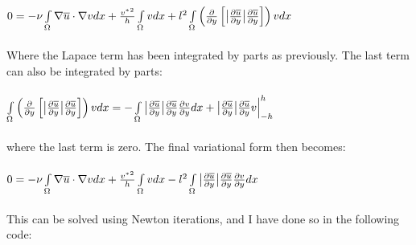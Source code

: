 \documentclass[a4paper,english,11pt,twoside]{article}
\begin{document}
\\
$0 = -\nu\int\limits_{\Omega}\nabla\overline{u}\cdot\nabla v dx + \frac{{v^*}^2}{h}\int\limits_{\Omega}v dx + l^2 \int\limits_{\Omega}\left(\frac{\partial}{\partial y}\left[\big|\frac{\partial\overline{u}}{\partial y}\big|\frac{\partial\overline{u}}{\partial y} \right]\right)v dx$\\
\\
Where the Lapace term has been integrated by parts as previously. The last term can also be integrated by parts:\\
\\
$\int\limits_{\Omega}\left(\frac{\partial}{\partial y}\left[\big|\frac{\partial\overline{u}}{\partial y}\big|\frac{\partial\overline{u}}{\partial y} \right]\right)v dx = - \int\limits_{\Omega}\big|\frac{\partial\overline{u}}{\partial y}\big|\frac{\partial\overline{u}}{\partial y} \frac{\partial v}{\partial y}dx + \big|\frac{\partial\overline{u}}{\partial y}\big|\frac{\partial\overline{u}}{\partial y}v\Big|_{-h}^{h}$\\
\\
where the last term is zero. The final variational form then becomes:\\
\\
$0 = -\nu\int\limits_{\Omega}\nabla\overline{u}\cdot\nabla v dx + \frac{{v^*}^2}{h}\int\limits_{\Omega}v dx - l^2\int\limits_{\Omega}\big|\frac{\partial\overline{u}}{\partial y}\big|\frac{\partial\overline{u}}{\partial y} \frac{\partial v}{\partial y}dx$\\
\\
\newpage
This can be solved using Newton iterations, and I have done so in the following code:\\
\\
\end{document}
